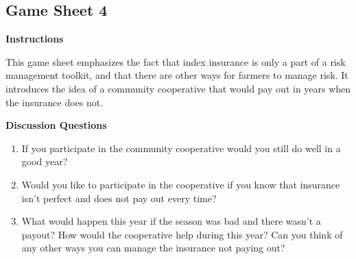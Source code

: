 \documentclass[letterpaper,10pt,english]{sphinxmanual}
\begin{document}
\subsection{Game Sheet 4}
\label{games/gameinstructions_quickreference_en:game-sheet-4}\begin{figure}[htbp]
\centering

\end{figure}

\textbf{Instructions}

This game sheet emphasizes the fact that index insurance is only a part of a risk management toolkit, and that there are other ways for farmers to manage risk. It introduces the idea of a community cooperative that would pay out in years when the insurance does not.

\textbf{Discussion Questions}
\begin{enumerate}
\item {} 
If you participate in the community cooperative would you still do well in a good year?

\item {} 
Would you like to participate in the cooperative if you know that insurance isn’t perfect and does not pay out every time?

\item {} 
What would happen this year if the season was bad and there wasn't a payout? How would the cooperative help during this year? Can you think of any other ways you can manage the insurance not paying out?

\end{enumerate}
\end{document}
